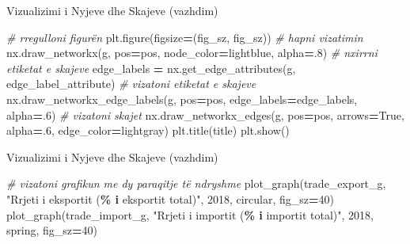 \documentclass[
  ignorenonframetext,
]{beamer}
\newenvironment{Shaded}{\begin{snugshade}}{\end{snugshade}}
\newcommand{\CommentTok}[1]{\textcolor[rgb]{0.56,0.35,0.01}{\textit{#1}}}
\newcommand{\DecValTok}[1]{\textcolor[rgb]{0.00,0.00,0.81}{#1}}
\newcommand{\FloatTok}[1]{\textcolor[rgb]{0.00,0.00,0.81}{#1}}
\newcommand{\NormalTok}[1]{#1}
\newcommand{\OperatorTok}[1]{\textcolor[rgb]{0.81,0.36,0.00}{\textbf{#1}}}
\newcommand{\SpecialCharTok}[1]{\textcolor[rgb]{0.81,0.36,0.00}{\textbf{#1}}}
\newcommand{\StringTok}[1]{\textcolor[rgb]{0.31,0.60,0.02}{#1}}
\newcommand{\VariableTok}[1]{\textcolor[rgb]{0.00,0.00,0.00}{#1}}
\begin{document}
\begin{frame}[fragile]{Vizualizimi i Nyjeve dhe Skajeve (vazhdim)}
\protect\hypertarget{vizualizimi-i-nyjeve-dhe-skajeve-vazhdim}{}

\begin{Shaded}
\begin{Highlighting}[]
    \CommentTok{\# rregulloni figurën}
\NormalTok{    plt.figure(figsize}\OperatorTok{=}\NormalTok{(fig\_sz, fig\_sz))}
    \CommentTok{\# hapni vizatimin}
\NormalTok{    nx.draw\_networkx(g, pos}\OperatorTok{=}\NormalTok{pos, node\_color}\OperatorTok{=}\StringTok{\textquotesingle{}lightblue\textquotesingle{}}\NormalTok{, alpha}\OperatorTok{=}\FloatTok{.8}\NormalTok{)}
    \CommentTok{\# nxirrni etiketat e skajeve}
\NormalTok{    edge\_labels }\OperatorTok{=}\NormalTok{ nx.get\_edge\_attributes(g, edge\_label\_attribute)}
    \CommentTok{\# vizatoni etiketat e skajeve}
\NormalTok{    nx.draw\_networkx\_edge\_labels(g, pos}\OperatorTok{=}\NormalTok{pos, edge\_labels}\OperatorTok{=}\NormalTok{edge\_labels, alpha}\OperatorTok{=}\FloatTok{.6}\NormalTok{)}
    \CommentTok{\# vizatoni skajet}
\NormalTok{    nx.draw\_networkx\_edges(g, pos}\OperatorTok{=}\NormalTok{pos, arrows}\OperatorTok{=}\VariableTok{True}\NormalTok{, alpha}\OperatorTok{=}\FloatTok{.6}\NormalTok{, edge\_color}\OperatorTok{=}\StringTok{\textquotesingle{}lightgray\textquotesingle{}}\NormalTok{)}
\NormalTok{    plt.title(title)}
\NormalTok{    plt.show()}
\end{Highlighting}
\end{Shaded}
\end{frame}

\begin{frame}[fragile]{Vizualizimi i Nyjeve dhe Skajeve (vazhdim)}
\protect\hypertarget{vizualizimi-i-nyjeve-dhe-skajeve-vazhdim-1}{}

\begin{Shaded}
\begin{Highlighting}[]
\CommentTok{\# vizatoni grafikun me dy paraqitje të ndryshme}
\NormalTok{plot\_graph(trade\_export\_g, }\StringTok{"Rrjeti i eksportit (}\SpecialCharTok{\% i}\StringTok{ eksportit total)"}\NormalTok{, }\StringTok{\textquotesingle{}2018\textquotesingle{}}\NormalTok{, }\StringTok{\textquotesingle{}circular\textquotesingle{}}\NormalTok{, fig\_sz}\OperatorTok{=}\DecValTok{40}\NormalTok{)}
\NormalTok{plot\_graph(trade\_import\_g, }\StringTok{"Rrjeti i importit (}\SpecialCharTok{\% i}\StringTok{ importit total)"}\NormalTok{, }\StringTok{\textquotesingle{}2018\textquotesingle{}}\NormalTok{, }\StringTok{\textquotesingle{}spring\textquotesingle{}}\NormalTok{, fig\_sz}\OperatorTok{=}\DecValTok{40}\NormalTok{)}
\end{Highlighting}
\end{Shaded}
\end{frame}
\end{document}
